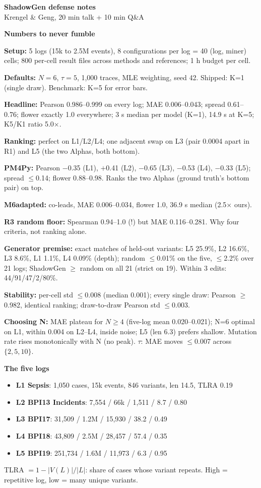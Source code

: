 \documentclass[10pt]{article}
\newcommand{\hdr}[1]{\vspace{5pt}\noindent\textcolor{hd}{\textbf{\large #1}}\par\vspace{2pt}}
\newcommand{\kv}[2]{\noindent\textbf{#1} #2\par}
\begin{document}
\begin{center}\textbf{\large ShadowGen defense notes}\\[1pt]
\small Krengel \& Geng, 20 min talk + 10 min Q\&A\end{center}

\hdr{Numbers to never fumble}
\kv{Setup:}{5 logs (15k to 2.5M events), 8 configurations per log = 40 (log, miner) cells; 800 per-cell result files across methods and references; 1 h budget per cell.}
\kv{Defaults:}{$N{=}6$, $\tau{=}5$, 1{,}000 traces, MLE weighting, seed 42. Shipped: K=1 (single draw). Benchmark: K=5 for error bars.}
\kv{Headline:}{Pearson 0.986--0.999 on every log; MAE 0.006--0.043; spread 0.61--0.76; flower exactly 1.0 everywhere; 3 s median per model (K=1), 14.9 s at K=5; K5/K1 ratio 5.0$\times$.}
\kv{Ranking:}{perfect on L1/L2/L4; one adjacent swap on L3 (pair 0.0004 apart in R1) and L5 (the two Alphas, both bottom).}
\kv{PM4Py:}{Pearson $-$0.35 (L1), $+$0.41 (L2), $-$0.65 (L3), $-$0.53 (L4), $-$0.33 (L5); spread $\le$0.14; flower 0.88--0.98. Ranks the two Alphas (ground truth's bottom pair) on top.}
\kv{M6adapted:}{co-leads, MAE 0.006--0.034, flower 1.0, 36.9 s median (2.5$\times$ ours).}
\kv{R3 random floor:}{Spearman 0.94--1.0 (!) but MAE 0.116--0.281. Why four criteria, not ranking alone.}
\kv{Generator premise:}{exact matches of held-out variants: L5 25.9\%, L2 16.6\%, L3 8.6\%, L1 1.1\%, L4 0.09\% (depth); random $\le$0.01\% on the five, $\le$2.2\% over 21 logs; ShadowGen $\ge$ random on all 21 (strict on 19). Within 3 edits: 44/91/47/2/80\%.}
\kv{Stability:}{per-cell std $\le$0.008 (median 0.001); every single draw: Pearson $\ge$0.982, identical ranking; draw-to-draw Pearson std $\le$0.003.}
\kv{Choosing N:}{MAE plateau for $N\ge4$ (five-log mean 0.020--0.021); N=6 optimal on L1, within 0.004 on L2--L4, inside noise; L5 (len 6.3) prefers shallow. Mutation rate rises monotonically with N (no peak). $\tau$: MAE moves $\le$0.007 across $\{2,5,10\}$.}

\hdr{The five logs}
\begin{itemize}
\item \textbf{L1 Sepsis}: 1{,}050 cases, 15k events, 846 variants, len 14.5, TLRA 0.19
\item \textbf{L2 BPI13 Incidents}: 7{,}554 / 66k / 1{,}511 / 8.7 / 0.80
\item \textbf{L3 BPI17}: 31{,}509 / 1.2M / 15{,}930 / 38.2 / 0.49
\item \textbf{L4 BPI18}: 43{,}809 / 2.5M / 28{,}457 / 57.4 / 0.35
\item \textbf{L5 BPI19}: 251{,}734 / 1.6M / 11{,}973 / 6.3 / 0.95
\end{itemize}
TLRA $=1-|V(L)|/|L|$: share of cases whose variant repeats. High = repetitive log, low = many unique variants.
\end{document}
